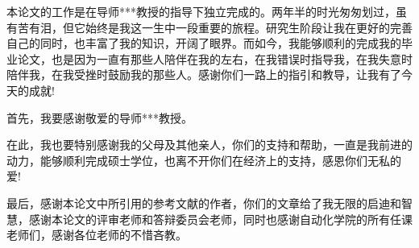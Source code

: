
\begin{thanks}

本论文的工作是在导师***教授的指导下独立完成的。两年半的时光匆匆划过，虽有苦有泪，但它始终是我这一生中一段重要的旅程。研究生阶段让我在更好的完善自己的同时，也丰富了我的知识，开阔了眼界。而如今，我能够顺利的完成我的毕业论文，也是因为一直有那些人陪伴在我的左右，在我错误时指导我，在我失意时陪伴我，在我受挫时鼓励我的那些人。感谢你们一路上的指引和教导，让我有了今天的成就!

首先，我要感谢敬爱的导师***教授。

在此，我也要特别感谢我的父母及其他亲人，你们的支持和帮助，一直是我前进的动力，能够顺利完成硕士学位，也离不开你们在经济上的支持，感恩你们无私的爱!

最后，感谢本论文中所引用的参考文献的作者，你们的文章给了我无限的启迪和智慧，感谢本论文的评审老师和答辩委员会老师，同时也感谢自动化学院的所有任课老师们，感谢各位老师的不惜吝教。

\end{thanks}
